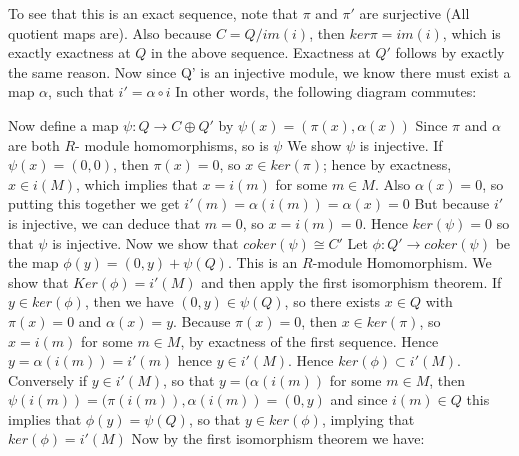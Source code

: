 \documentclass{article}
\begin{document}
To see that this is an exact sequence, note that $\pi$ and $\pi'$ are surjective (All quotient maps are).
Also because $C=Q / im(i)$, then $ker \pi = im(i)$, which is exactly exactness at $Q$ in the above sequence.
Exactness at $Q'$ follows by exactly the same reason.
\newline
\newline
Now since Q' is an injective module, we know there must exist a map $\alpha$, such that $i' = \alpha \circ i$ In other words, the following diagram commutes:
\newline
{}
\newline
Now define a map $\psi: Q \rightarrow C \oplus Q'$ by $\psi(x) = (\pi(x), \alpha(x))$
Since $\pi$ and $\alpha$ are both $R$- module homomorphisms, so is $\psi$ \newline
We show $\psi$ is injective. If $\psi(x) = (0,0)$, then $\pi(x) = 0$, so $x \in ker(\pi)$; hence by exactness, $x \in i(M)$, which implies that $x = i(m)$ for some $m \in M$.  Also $\alpha(x) = 0$, so putting this together we get $i'(m) = \alpha(i(m))=\alpha(x)=0$ But because $i'$ is injective, we can deduce that $m=0$, so $x=i(m)=0$. Hence $ker(\psi) = 0$ so that $\psi$ is injective.
\newline
\newline
Now we show that $coker(\psi) \cong C'$ 
\newline
Let $\phi : Q' \rightarrow coker(\psi)$ be the map
$\phi(y)= (0,y) + \psi(Q)$. 
This is an $R$-module Homomorphism.  We show that $Ker(\phi) = i'(M)$ and then apply the first isomorphism theorem.  
\newline
If $y\in ker(\phi)$, then we have $(0,y) \in \psi(Q)$, so there exists $x \in Q$ with $\pi(x) = 0$ and $\alpha(x)=y$.  Because $\pi(x)=0$, then $x\in ker (\pi)$, so $x = i(m)$ for some $m\in M$, by exactness of the first sequence.  Hence $y=\alpha(i(m)) = i'(m)$ hence $y \in i'(M)$. Hence $ker(\phi) \subset i'(M)$.
\newline
\newline
 Conversely if $y \in i'(M)$, so that $y=(\alpha(i(m))$ for some $m\in M$, then $\psi(i(m))= (\pi(i(m)),\alpha(i(m))=(0,y)$ and since $i(m) \in Q$ this implies that $\phi(y) = \psi(Q)$, so that $y\in ker(\phi)$, implying that $ker(\phi) = i'(M)$
 Now by the first isomorphism theorem we have:
\end{document}
